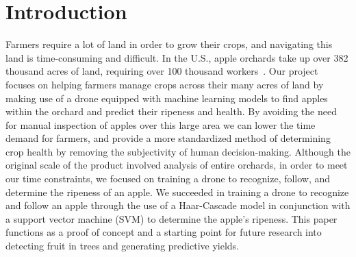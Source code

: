 \section{Introduction}
Farmers require a lot of land in order to grow their crops, and navigating this land
is time-consuming and difficult.
In the U.S., apple orchards take up over 382 thousand acres of land, requiring over
100 thousand workers~\cite{USApple}.
Our project focuses on helping farmers manage crops across their many acres of land
by making use of a drone equipped with machine learning models to
find apples within the orchard and predict their ripeness and health.
By avoiding the need for manual inspection of apples over this large area
we can lower the time demand for farmers, and provide a more standardized method of
determining crop health by removing the subjectivity of human decision-making.
Although the original scale of the product involved analysis of entire orchards, in
order to meet our time constraints, we focused on training a drone to recognize,
follow, and determine the ripeness of an apple.
We succeeded in training a drone to recognize and follow an apple through the use of
a Haar-Cascade model in conjunction with a support vector machine (SVM) to determine
the apple's ripeness.
This paper functions as a proof of concept and a starting point for future research
into detecting fruit in trees and generating predictive yields.
